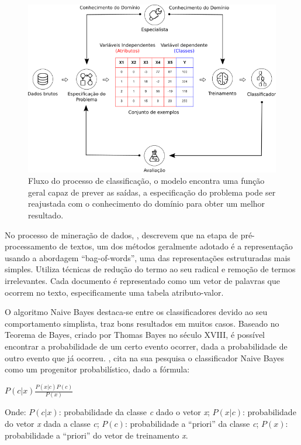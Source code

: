 \begin{figure}[H]
\begin{center}
    \includegraphics[scale=0.60]{images/processo_classificacao.png}
\end{center}
\caption{Fluxo do processo de classificação, o modelo encontra uma função geral 
capaz de prever as saídas, a especificação do problema pode ser reajustada com 
o conhecimento do domínio para obter um melhor resultado.}
\label{figure:processo_classificacao}
\end{figure}

No processo de mineração de dados, , descrevem 
que na etapa de pré-processamento de textos, um dos métodos geralmente adotado 
é a representação usando a abordagem ``bag-of-words'', uma das representações 
estruturadas mais simples. Utiliza técnicas de redução do termo ao seu radical 
e remoção de termos irrelevantes. Cada documento é representado como um vetor 
de palavras que ocorrem no texto, especificamente uma tabela atributo-valor. 

O algoritmo Naive Bayes destaca-se entre os classificadores devido ao seu 
comportamento simplista, traz bons resultados em muitos casos. Baseado no 
Teorema de Bayes, criado por Thomas Bayes no século XVIII, é possível encontrar 
a probabilidade de um certo evento ocorrer, dada a probabilidade de outro 
evento que já ocorreu. , cita na sua pesquisa o 
classificador Naive Bayes como um progenitor probabilístico, dado a fórmula:
\begin{center}
\( \textit{P}(c|x)\frac{\textit{P}(x|c)\textit{P}(c)}{\textit{P}(x)} \)
\end{center}
Onde: \(\textit{P}(c|x)\): probabilidade da classe \textit{c} dado o vetor 
\textit{x}; \(\textit{P}(x|c)\): probabilidade do vetor \textit{x} dada a 
classe \textit{c}; \(\textit{P}(c)\): probabilidade a ``priori'' da classe 
\textit{c}; \(\textit{P}(x)\): probabilidade a ``priori'' do vetor de 
treinamento \textit{x}.

